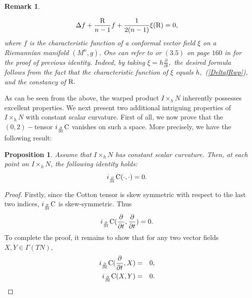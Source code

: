 \documentclass[10pt,leqno,oneside]{amsart}
\newtheorem{Prop}{Proposition}
\newtheorem{Rmk}{Remark}
\begin{document}
{\begin{Rmk}
\begin{itemize}[leftmargin=0.5cm, itemindent=0.4cm]
         \begin{equation*}
              \Delta f+\frac{\rm{R}}{n-1}f+\frac{1}{2(n-1)}\xi({\rm{R}})=0,
        \end{equation*}
        where $f$ is the characteristic function of a conformal vector field $\xi$ on a Riemannian manifold $(M^n, g).$ One can refer to {\rm\cite[Lemma 4.2]{Xu1993}} or $(3.5)$ on page $160$ in {\rm\cite{Yano1975}} for the proof of previous identity. Indeed, by taking $\xi=h\frac{\partial}{\partial t},$ the desired formula follows from the fact that the characteristic function of $\xi$ equals $\dot{h},$ {\rm(\ref{DeltafRwp})}, and the constancy of ${\rm{R}}.$
         \end{itemize}
    \end{Rmk}

          As can be seen from the above, the warped product \(I\times_h N\) inherently possesses excellent properties. We next present two additional intriguing properties of \(I\times_h N\) with constant scalar curvature. First of all, we now prove that the $(0,2)-$tensor $i_{\frac{\partial}{\partial t}}{\rm{C}}$ vanishes on such a space. More precisely, we have the following result:
    \begin{Prop}\label{iCzero}
          Assume that $I\times_hN $ has constant scalar curvature. Then, at each point on $I\times_hN $, the following identity holds:
          $$i_{\frac{\partial}{\partial t}}{\rm{C}}(\cdot,\cdot)=0.$$
    \end{Prop}
    \begin{proof}
          Firstly, since the Cotton tensor is skew symmetric with respect to the last two indices, $i_{\frac{\partial}{\partial t}}{\rm{C}}$ is skew-symmetric. Thus
          \begin{equation*}\label{C1}
                i_{\frac{\partial}{\partial t}}{\rm{C}}(\frac{\partial}{\partial t},\frac{\partial}{\partial t})=0.
          \end{equation*}
          To complete the proof, it remains to show that for any two vector fields $X,Y\in\Gamma(TN ),$
          \begin{eqnarray}\label{C2}
            i_{\frac{\partial}{\partial t}}{\rm{C}}(\frac{\partial}{\partial t},X)&=& 0, \\\label{C3}
            i_{\frac{\partial}{\partial t}}{\rm{C}}(X,Y) &=& 0.
          \end{eqnarray}

\end{proof}}
\end{document}
